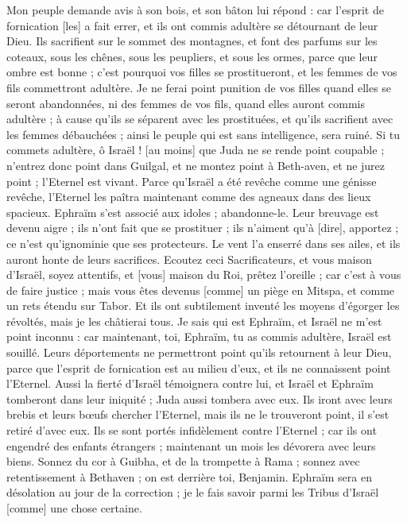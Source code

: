 \begin{multicols}{2}
Mon peuple demande avis à son bois, et son bâton lui répond : car l'esprit de fornication [les] a fait errer, et ils ont commis adultère se détournant de leur Dieu.
Ils sacrifient sur le sommet des montagnes, et font des parfums sur les coteaux, sous les chênes, sous les peupliers, et sous les ormes, parce que leur ombre est bonne ; c'est pourquoi vos filles se prostitueront, et les femmes de vos fils commettront adultère.
Je ne ferai point punition de vos filles quand elles se seront abandonnées, ni des femmes de vos fils, quand elles auront commis adultère ; à cause qu'ils se séparent avec les prostituées, et qu'ils sacrifient avec les femmes débauchées ; ainsi le peuple qui est sans intelligence, sera ruiné.
Si tu commets adultère, ô Israël ! [au moins] que Juda ne se rende point coupable ; n'entrez donc point dans Guilgal, et ne montez point à Beth-aven, et ne jurez point ; l'Eternel est vivant.
Parce qu'Israël a été revêche comme une génisse revêche, l'Eternel les paîtra maintenant comme des agneaux dans des lieux spacieux.
Ephraïm s'est associé aux idoles ; abandonne-le.
Leur breuvage est devenu aigre ; ils n'ont fait que se prostituer ; ils n'aiment qu'à [dire], apportez ; ce n'est qu'ignominie que ses protecteurs.
Le vent l'a enserré dans ses ailes, et ils auront honte de leurs sacrifices.
\VerseOne{}Ecoutez ceci Sacrificateurs, et vous maison d'Israël, soyez attentifs, et [vous] maison du Roi, prêtez l'oreille ; car c'est à vous de faire justice ; mais vous êtes devenus [comme] un piège en Mitspa, et comme un rets étendu sur Tabor.
Et ils ont subtilement inventé les moyens d'égorger les révoltés, mais je les châtierai tous.
Je sais qui est Ephraïm, et Israël ne m'est point inconnu : car maintenant, toi, Ephraïm, tu as commis adultère, Israël est souillé.
Leurs déportements ne permettront point qu'ils retournent à leur Dieu, parce que l'esprit de fornication est au milieu d'eux, et ils ne connaissent point l'Eternel.
Aussi la fierté d'Israël témoignera contre lui, et Israël et Ephraïm tomberont dans leur iniquité ; Juda aussi tombera avec eux.
Ils iront avec leurs brebis et leurs bœufs chercher l'Eternel, mais ils ne le trouveront point, il s'est retiré d'avec eux.
Ils se sont portés infidèlement contre l'Eternel ; car ils ont engendré des enfants étrangers ; maintenant un mois les dévorera avec leurs biens.
Sonnez du cor à Guibha, et de la trompette à Rama ; sonnez avec retentissement à Bethaven ; on est derrière toi, Benjamin.
Ephraïm sera en désolation au jour de la correction ; je le fais savoir parmi les Tribus d'Israël [comme] une chose certaine.

\end{multicols}
